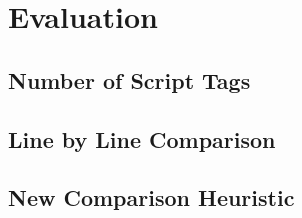 \section{Evaluation}
\label{sec:eval}

\subsection{Number of Script Tags}

\subsection{Line by Line Comparison}

\subsection{New Comparison Heuristic}
